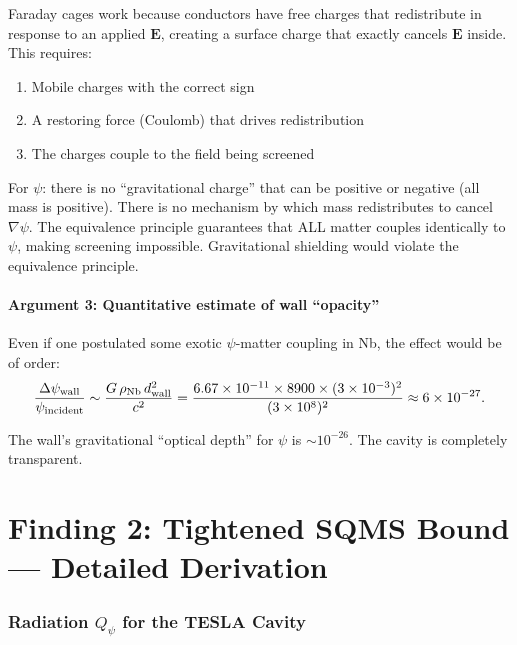 \documentclass[11pt]{article}
\newcommand{\ee}[1]{\times 10^{#1}}
\newcommand{\Qpsi}{Q_\psi}
\theoremstyle{definition}
\theoremstyle{remark}
\begin{document}
Faraday cages work because conductors have free charges that
redistribute in response to an applied $\mathbf{E}$, creating a
surface charge that exactly cancels $\mathbf{E}$ inside. This requires:
\begin{enumerate}[nosep]
\item Mobile charges with the correct sign
\item A restoring force (Coulomb) that drives redistribution
\item The charges couple to the field being screened
\end{enumerate}

For $\psi$: there is no ``gravitational charge'' that can be positive
or negative (all mass is positive). There is no mechanism by which
mass redistributes to cancel $\nabla\psi$. The equivalence principle
guarantees that ALL matter couples identically to $\psi$, making
screening impossible. Gravitational shielding would violate the
equivalence principle.

\subsection{Argument 3: Quantitative estimate of wall ``opacity''}

Even if one postulated some exotic $\psi$-matter coupling in Nb,
the effect would be of order:
\begin{equation}
\frac{\Delta\psi_{\rm wall}}{\psi_{\rm incident}}
\sim \frac{G\,\rho_{\rm Nb}\,d_{\rm wall}^2}{c^2}
= \frac{6.67\ee{-11} \times 8900 \times (3\ee{-3})^2}{(3\ee{8})^2}
\approx 6\ee{-27}.
\end{equation}

The wall's gravitational ``optical depth'' for $\psi$ is $\sim 10^{-26}$.
The cavity is completely transparent.


\part{Finding 2: Tightened SQMS Bound --- Detailed Derivation}
\label{part:sqms}


\section{Radiation $\Qpsi$ for the TESLA Cavity}
\end{document}

